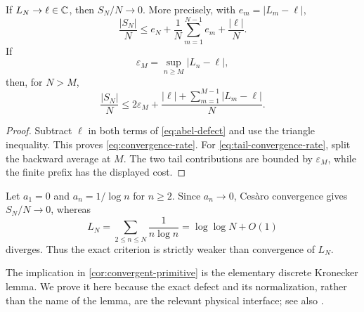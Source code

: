 \begin{corollary}
\label{cor:convergent-primitive}
If \(L_N\to\ell\in\mathbb C\), then \(S_N/N\to0\).  More precisely, with
\(e_m=|L_m-\ell|\),
\begin{equation}
 \frac{|S_N|}{N}
 \le e_N+\frac1N\sum_{m=1}^{N-1}e_m+\frac{|\ell|}{N}.
\label{eq:convergence-rate}
\end{equation}
If
\[
 \varepsilon_M=\sup_{n\ge M}|L_n-\ell|,
\]
then, for \(N>M\),
\begin{equation}
 \frac{|S_N|}{N}
 \le2\varepsilon_M+
 \frac{|\ell|+\sum_{m=1}^{M-1}|L_m-\ell|}{N}.
\label{eq:tail-convergence-rate}
\end{equation}
\end{corollary}

\begin{proof}
Subtract \(\ell\) in both terms of \eqref{eq:abel-defect} and use
the triangle inequality.  This proves \eqref{eq:convergence-rate}.
For \eqref{eq:tail-convergence-rate}, split the backward average at
\(M\).  The two tail contributions are bounded by
\(\varepsilon_M\), while the finite prefix has the displayed cost.
\end{proof}

\begin{remark}
\label{rem:convergence-not-necessary}
Let \(a_1=0\) and \(a_n=1/\log n\) for \(n\ge2\).  Since
\(a_n\to0\), Ces\`aro convergence gives \(S_N/N\to0\), whereas
\[
 L_N=\sum_{2\le n\le N}\frac1{n\log n}
 =\log\log N+O(1)
\]
diverges.  Thus the exact criterion is strictly weaker than
convergence of \(L_N\).
\end{remark}

\begin{remark}
The implication in \cref{cor:convergent-primitive} is the elementary
discrete Kronecker lemma.  We prove it here because the exact defect
and its normalization, rather than the name of the lemma, are the
relevant physical interface; see also \citet{Hardy1949}.
\end{remark}
